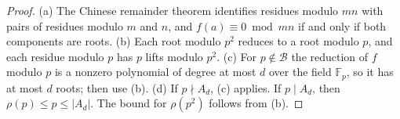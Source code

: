 \begin{proof}
(a) The Chinese remainder theorem identifies residues modulo $mn$ with pairs of residues modulo $m$ and $n$, and $f(a)\equiv0\bmod mn$ if and only if both components are roots. (b) Each root modulo $p^2$ reduces to a root modulo $p$, and each residue modulo $p$ has $p$ lifts modulo $p^2$. (c) For $p\notin\mathcal B$ the reduction of $f$ modulo $p$ is a nonzero polynomial of degree at most $d$ over the field $\mathbb F_p$, so it has at most $d$ roots; then use (b). (d) If $p\nmid A_d$, (c) applies. If $p\mid A_d$, then $\rho(p)\le p\le|A_d|$. The bound for $\rho(p^2)$ follows from (b).
\end{proof}
